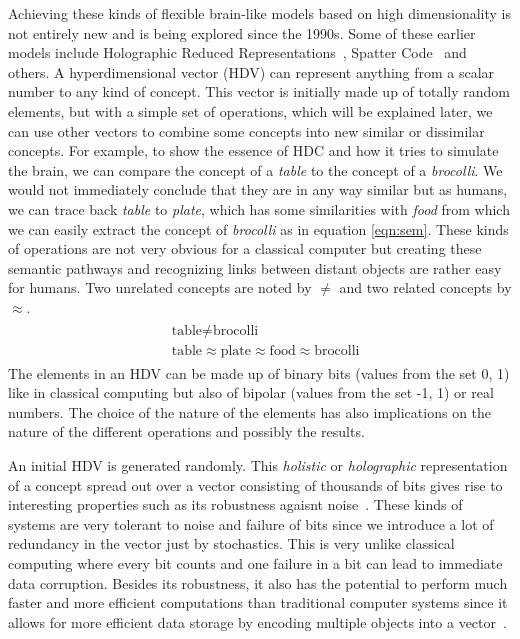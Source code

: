 Achieving these kinds of flexible brain-like models based on high dimensionality is not entirely new and is being explored since the 1990s. Some of these earlier models include Holographic Reduced Representations~\cite{HRR}, Spatter Code~\cite{spatter} and others. A hyperdimensional vector (HDV) can represent anything from a scalar number to any kind of concept. This vector is initially made up of totally random elements, but with a simple set of operations, which will be explained later, we can use other vectors to combine some concepts into new similar or dissimilar concepts. For example, to show the essence of HDC and how it tries to simulate the brain, we can compare the concept of a \textit{table} to the concept of a \textit{brocolli}. We would not immediately conclude that they are in any way similar but as humans, we can trace back \textit{table} to \textit{plate}, which has some similarities with \textit{food} from which we can easily extract the concept of \textit{brocolli} as in equation \ref{eqn:sem}. These kinds of operations are not very obvious for a classical computer but creating these semantic pathways and recognizing links between distant objects are rather easy for humans. Two unrelated concepts are noted by $\neq$ and two related concepts by $\approx$.
\begin{align}\label{eqn:sem}
    \begin{split}
    &\textrm{table} \neq \textrm{brocolli} \\        
    &\textrm{table} \approx \textrm{plate} \approx \textrm{food} \approx \textrm{brocolli}
    \end{split}
\end{align}
The elements in an HDV can be made up of binary bits (values from the set {0, 1}) like in classical computing but also of bipolar (values from the set {-1, 1}) or real numbers. The choice of the nature of the elements has also implications on the nature of the different operations and possibly the results.

An initial HDV is generated randomly. This \textit{holistic} or \textit{holographic} representation of a concept spread out over a vector consisting of thousands of bits gives rise to interesting properties such as its robustness agaisnt noise~\cite{hdctheo}. These kinds of systems are very tolerant to noise and failure of bits since we introduce a lot of redundancy in the vector just by stochastics. This is very unlike classical computing where every bit counts and one failure in a bit can lead to immediate data corruption. Besides its robustness, it also has the potential to perform much faster and more efficient computations than traditional computer systems since it allows for more efficient data storage by encoding multiple objects into a vector~\cite{Kanerva2009}\cite{hdctheo}.
